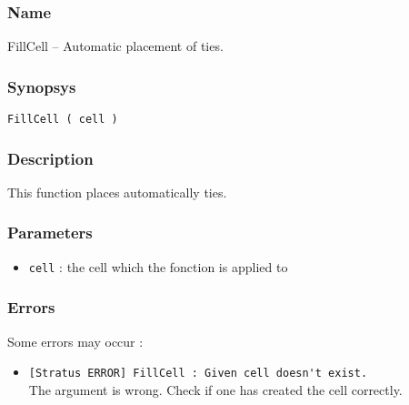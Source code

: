 \subsubsection{Name}

FillCell -- Automatic placement of ties.

\subsubsection{Synopsys}

\begin{verbatim}
FillCell ( cell )
\end{verbatim}

\subsubsection{Description}

This function places automatically ties.
    
\subsubsection{Parameters}

\begin{itemize}
    \item \verb-cell- : the cell which the fonction is applied to
\end{itemize}
    
%
%
\subsubsection{Errors}
    
Some errors may occur :
\begin{itemize}
    \item \verb-[Stratus ERROR] FillCell : Given cell doesn't exist.-\\The argument is wrong. Check if one has created the cell correctly.
\end{itemize}

